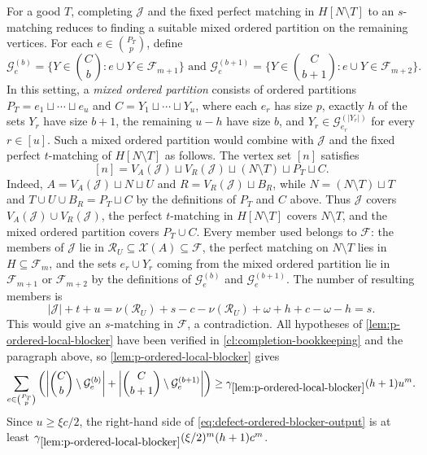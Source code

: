 \documentclass[10pt,a4paper]{article}
\numberwithin{equation}{section}
\theoremstyle{definition}
\newcommand{\F}{\mathcal F}
\newcommand{\G}{\mathcal G}
\newcommand{\X}{\mathcal X}
\newcommand{\Rcal}{\mathcal R}
\begin{document}
For a good $T$, completing $\mathcal J$ and the fixed perfect matching in $H[N\setminus T]$ to an $s$-matching reduces to finding a suitable mixed ordered partition on the remaining vertices.
For each $e\in\binom{P_T}p$, define
\[
        \G_e^{(b)}=\{Y\in\binom Cb:e\cup Y\in\F_{m+1}\} \text{ and }
        \G_e^{(b+1)}=\{Y\in\binom C{b+1}:e\cup Y\in\F_{m+2}\}.
\]
In this setting, a \emph{mixed ordered partition} consists of ordered partitions
$P_T=e_1\sqcup\cdots\sqcup e_u$ and
$C=Y_1\sqcup\cdots\sqcup Y_u$, where each $e_r$ has size $p$,
exactly $h$ of the sets $Y_r$ have size $b+1$, the remaining
$u-h$ have size $b$, and $Y_r\in\G_{e_r}^{(|Y_r|)}$ for every
$r\in[u]$.
Such a mixed ordered partition would combine with $\mathcal J$ and
the fixed perfect $t$-matching of $H[N\setminus T]$ as follows.
The vertex set $[n]$ satisfies
\[
        [n]
        =V_A(\mathcal J)\sqcup V_R(\mathcal J)
        \sqcup (N\setminus T)\sqcup P_T\sqcup C.
\]
Indeed, $A=V_A(\mathcal J)\sqcup N\sqcup U$ and $R=V_R(\mathcal J)\sqcup B_R$, while $N=(N\setminus T)\sqcup T$ and $T\cup U\cup B_R=P_T\sqcup C$ by the definitions of $P_T$ and $C$ above.
Thus $\mathcal J$ covers $V_A(\mathcal J)\cup V_R(\mathcal J)$, the perfect $t$-matching in $H[N\setminus T]$ covers $N\setminus T$, and the mixed ordered partition covers $P_T\cup C$.
Every member used belongs to $\F$: the members of $\mathcal J$ lie in
$\Rcal_U\subseteq\X(A)\subseteq\F$, the perfect matching on
$N\setminus T$ lies in $H\subseteq\F_m$, and the sets
$e_r\cup Y_r$ coming from the mixed ordered partition lie in
$\F_{m+1}$ or $\F_{m+2}$ by the definitions of
$\G_e^{(b)}$ and $\G_e^{(b+1)}$.
The number of resulting members is
\[
        |\mathcal J|+t+u
        =\nu(\Rcal_U)+s-c-\nu(\Rcal_U)+\omega+h+c-\omega-h
        =s.
\]
This would give an $s$-matching in $\F$, a contradiction.
All hypotheses of \cref{lem:p-ordered-local-blocker} have been verified in \cref{cl:completion-bookkeeping} and the paragraph above, so \cref{lem:p-ordered-local-blocker} gives
\begin{equation}\label{eq:defect-ordered-blocker-output}
        \sum_{e\in\binom{P_T}p}
        \left(
        \left|\binom Cb\setminus\G_e^{(b)}\right|
        +
        \left|\binom C{b+1}\setminus\G_e^{(b+1)}\right|
        \right)
        \ge \gamma_{\ref{lem:p-ordered-local-blocker}}(h+1)u^m.
\end{equation}
Since $u\ge\xi c/2$, the right-hand side of
\eqref{eq:defect-ordered-blocker-output} is at least
$\gamma_{\ref{lem:p-ordered-local-blocker}}(\xi/2)^m(h+1)c^m$.
\end{document}
